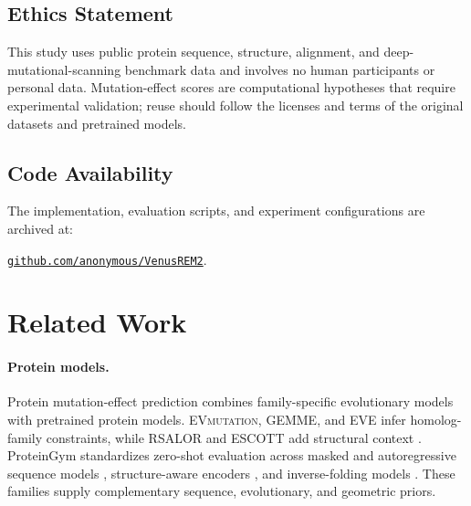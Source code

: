 \documentclass{article} %
\renewcommand{\topfraction}{0.95}
\renewcommand{\bottomfraction}{0.4}
\renewcommand{\textfraction}{0.05}
\renewcommand{\floatpagefraction}{0.8}
\begin{document}
\subsection*{Ethics Statement}
This study uses public protein sequence, structure, alignment, and deep-mutational-scanning benchmark data and involves no human participants or personal data. Mutation-effect scores are computational hypotheses that require experimental validation; reuse should follow the licenses and terms of the original datasets and pretrained models.

\subsection*{Code Availability}
The implementation, evaluation scripts, and experiment configurations are archived at:\par
\noindent\href{https://github.com/anonymous/VenusREM2}{\texttt{github.com/anonymous/VenusREM2}}.

\FloatBarrier

\setlength{\bibsep}{0pt plus 0.3ex}



\clearpage
\appendix

\setcounter{topnumber}{4}
\setcounter{bottomnumber}{2}
\setcounter{totalnumber}{6}
\renewcommand{\topfraction}{0.97}
\renewcommand{\bottomfraction}{0.90}
\renewcommand{\textfraction}{0.03}
\renewcommand{\floatpagefraction}{0.72}
\setlength{\textfloatsep}{8pt plus 2pt minus 2pt}
\setlength{\floatsep}{7pt plus 2pt minus 2pt}
\setlength{\intextsep}{8pt plus 2pt minus 2pt}

\section{Related Work}
\label{app:related_work}

\paragraph{Protein models.}
Protein mutation-effect prediction combines family-specific evolutionary models with pretrained protein models. \textsc{EVmutation}, \textsc{GEMME}, and \textsc{EVE} infer homolog-family constraints, while \textsc{RSALOR} and \textsc{ESCOTT} add structural context \citep{hopf2017evmutation,laine2019gemme,frazer2021eve,tsishyn2025rsalor,tekpinar2025prescott}. ProteinGym standardizes zero-shot evaluation \citep{notin2024proteingym} across masked and autoregressive sequence models \citep{meier2021esm1v,rives2021esm1b,lin2023esm2,madani2023progen,nijkamp2023progen2,hesslow2022rita,carp}, structure-aware encoders \citep{su2023saprot,li2024prosst,hayes2025esm3,zhang2024s3f,tan2025protssn}, and inverse-folding models \citep{hsu2022esm-if1,dauparas2022proteinmpnn,mifst}. These families supply complementary sequence, evolutionary, and geometric priors.
\end{document}

